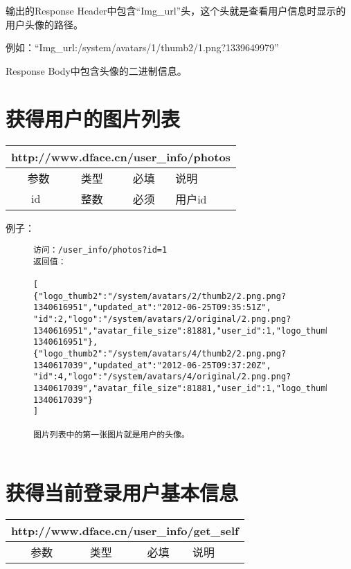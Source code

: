 \documentclass[cs4size]{ctexartutf8}
\begin{document}
输出的Response Header中包含“Img\_url”头，这个头就是查看用户信息时显示的用户头像的路径。

例如：“Img\_url:/system/avatars/1/thumb2/1.png?1339649979”

Response Body中包含头像的二进制信息。


\section{获得用户的图片列表}

\begin{table}[H]
   \begin{center}
\begin{tabular}{|c|c|c|p{12cm}|}
\hline
\multicolumn{4}{|c|}{http://www.dface.cn/user\_info/photos} \\
\hline\hline
 \  参数  & 类型 & 必填 &  说明  \\
\hline
 id  & 整数 & 必须 &  用户id\\
\hline
\end{tabular}
   \end{center}
\end{table}


例子：

\begin{figure}[H]
\begin{verbatim}
访问：/user_info/photos?id=1
返回值：

[
{"logo_thumb2":"/system/avatars/2/thumb2/2.png.png?1340616951","updated_at":"2012-06-25T09:35:51Z",
"id":2,"logo":"/system/avatars/2/original/2.png.png?1340616951","avatar_file_size":81881,"user_id":1,"logo_thumb":"/system/avatars/2/thumb/2.png.png?1340616951"},
{"logo_thumb2":"/system/avatars/4/thumb2/2.png.png?1340617039","updated_at":"2012-06-25T09:37:20Z",
"id":4,"logo":"/system/avatars/4/original/2.png.png?1340617039","avatar_file_size":81881,"user_id":1,"logo_thumb":"/system/avatars/4/thumb/2.png.png?1340617039"}
]

图片列表中的第一张图片就是用户的头像。


\end{verbatim}
\end{figure}



\section{获得当前登录用户基本信息}

\begin{table}[H]
   \begin{center}
\begin{tabular}{|c|c|c|p{12cm}|}
\hline
\multicolumn{4}{|c|}{http://www.dface.cn/user\_info/get\_self} \\
\hline\hline
 \  参数  & 类型 & 必填 &  说明  \\
\hline
\end{tabular}
   \end{center}
\end{table}
\end{document}
